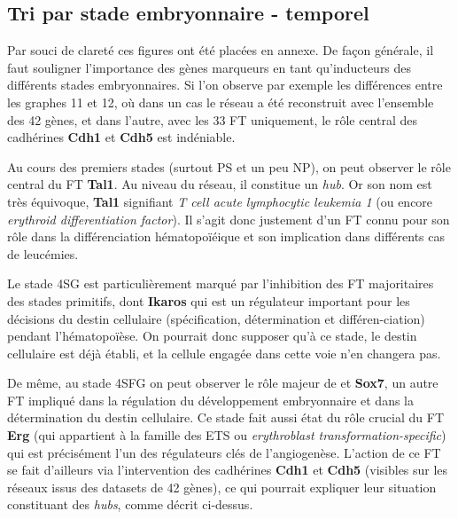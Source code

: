 \documentclass[fleqn,11pt]{SelfArx} %
\begin{document}
\subsection{Tri par stade embryonnaire -  temporel}
Par souci de clareté ces figures ont été placées en annexe. De façon générale, il faut souligner l'importance des gènes marqueurs en tant qu'inducteurs des différents stades embryonnaires. Si l'on observe par exemple les différences entre les graphes 11 et 12, où dans un cas le réseau a été reconstruit avec l'ensemble des 42 gènes, et dans l'autre, avec les 33 FT uniquement, le rôle central des cadhérines \textbf{Cdh1} et \textbf{Cdh5} est indéniable. 
\par Au cours des premiers stades (surtout PS et un peu NP), on peut observer le rôle central du FT \textbf{Tal1}. Au niveau du réseau, il constitue un \textit{hub}. Or son nom est très équivoque, \textbf{Tal1} signifiant \textit{T cell acute lymphocytic leukemia 1} (ou encore \textit{erythroid differentiation factor}). Il s'agit donc justement d'un FT connu pour son rôle dans la différenciation hématopoïéique et son implication dans différents cas de leucémies.
\par Le stade 4SG est particulièrement marqué par l'inhibition des FT majoritaires des stades primitifs, dont \textbf{Ikaros} qui est un régulateur important pour les décisions du destin cellulaire (spécification, détermination et différen-ciation) pendant l'hématopoïèse. On pourrait donc supposer qu'à ce stade, le destin cellulaire est déjà établi, et la cellule engagée dans cette voie n'en changera pas. 
\par De même, au stade 4SFG on peut observer le rôle majeur de  et \textbf{Sox7}, un autre FT impliqué dans la régulation du développement embryonnaire et dans la détermination du destin cellulaire. Ce stade fait aussi état du rôle crucial du FT \textbf{Erg} (qui appartient à la famille des ETS ou \textit{erythroblast transformation-specific}) qui est précisément l'un des régulateurs clés de l'angiogenèse. L'action de ce FT se fait d'ailleurs via l'intervention des cadhérines \textbf{Cdh1} et \textbf{Cdh5} (visibles sur les réseaux issus des datasets de 42 gènes), ce qui pourrait expliquer leur situation constituant des \textit{hubs}, comme décrit ci-dessus\cite{Erg}.


\end{document}
